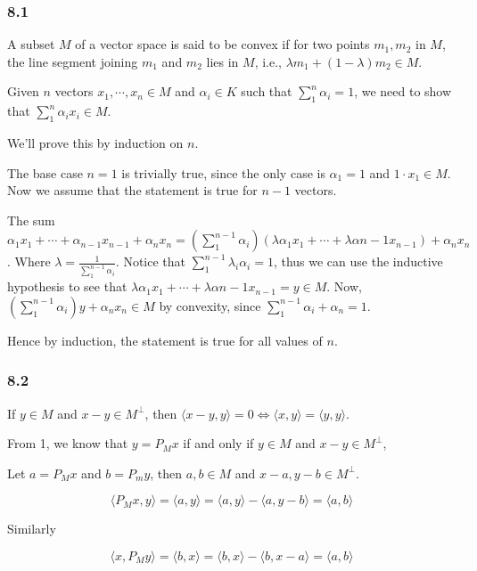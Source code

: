 \documentclass[11pt]{article}
\begin{document}
\subsubsection{8.1}
\label{sec:orga446437}
A subset \(M\) of a vector space is said to be convex if for two points \(m_1,
    m_2\) in \(M\), the line segment joining \(m_1\) and \(m_2\) lies in \(M\), i.e.,
\(\lambda m_1 + (1-\lambda)m_2 \in M\).

Given \(n\) vectors \(x_1, \cdots, x_n\in M\) and \(\alpha_i \in K\) such that
\(\sum_1^n \alpha_i = 1\), we need to show that \(\sum_1^n \alpha_i x_i \in M\).

We'll prove this by induction on \(n\).

The base case \(n=1\) is trivially true, since the only case is \(\alpha_1 = 1\)
and \(1\cdot x_1 \in M\). Now we assume that the statement is true for \(n-1\)
vectors.

The sum \(\alpha_1x_1 + \cdots + \alpha_{n-1}x_{n-1} + \alpha_nx_n=
    (\sum_1^{n-1}\alpha_i)(\lambda\alpha_1 x_1 + \cdots +
    \lambda\alpha{n-1}x_{n-1}) + \alpha_n x_n\). Where \(\lambda =
    \frac{1}{\sum_1^{n-1} \alpha_i}\). Notice that \(\sum_1^{n-1} \lambda_i
    \alpha_i = 1\), thus we can use the inductive hypothesis to see that
\(\lambda\alpha_1 x_1 + \cdots + \lambda\alpha{n-1}x_{n-1} = y \in M\). Now,
\((\sum_1^{n-1}\alpha_i)y + \alpha_n x_n \in M\) by convexity, since
\(\sum_1^{n-1}\alpha_i + \alpha_n = 1\).

Hence by induction, the statement is true for all values of \(n\).
\subsubsection{8.2}
\label{sec:orgdcdd84d}
If \(y \in M\) and \(x - y \in M^{\perp}\), then \(\langle x - y, y \rangle = 0
    \iff \langle x, y \rangle = \langle y, y \rangle\).

From 1, we know that \(y = P_Mx\) if and only if \(y \in M\) and \(x - y \in
    M^\perp\),

Let \(a = P_M x\) and \(b = P_m y\), then \(a, b \in M\) and \(x-a, y-b \in
    M^\perp\).

$$\langle P_M x, y \rangle = \langle a, y \rangle = \langle a, y \rangle - \langle a, y - b \rangle =
    \langle a, b\rangle$$

Similarly

$$\langle x, P_M y \rangle = \langle b, x \rangle = \langle b, x \rangle - \langle b, x - a \rangle =
    \langle a, b\rangle$$
\end{document}
